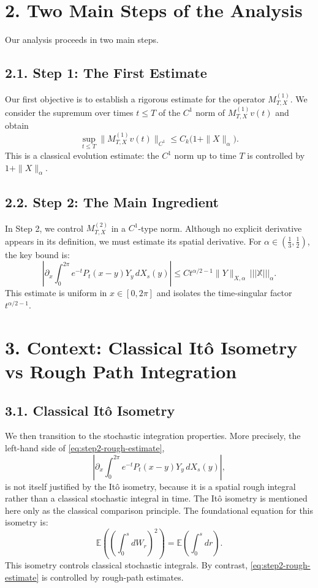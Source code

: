 \documentclass[11pt]{article}
\theoremstyle{definition}
\theoremstyle{remark}
\begin{document}
\section*{2. Two Main Steps of the Analysis}
Our analysis proceeds in two main steps.

\subsection*{2.1. Step 1: The First Estimate}
Our first objective is to establish a rigorous estimate for the operator $M_{T,X}^{(1)}$. We consider the supremum over times $t\leq T$ of the $C^1$ norm of $M_{T,X}^{(1)}v(t)$ and obtain
\[
\sup_{t\le T}\|M_{T,X}^{(1)}v(t)\|_{C^1}\le C_k\bigl(1+\|X\|_\alpha\bigr).
\]
This is a classical evolution estimate: the $C^1$ norm up to time $T$ is controlled by $1+\|X\|_\alpha$.

\subsection*{2.2. Step 2: The Main Ingredient}
In Step 2, we control $M_{T,X}^{(2)}$ in a $C^1$-type norm. Although no explicit derivative appears in its definition, we must estimate its spatial derivative. For $\alpha\in(\frac13,\frac12)$, the key bound is:
\begin{equation}\label{eq:step2-rough-estimate}
\left|\partial_x\int_0^{2\pi} e^{-t}P_t(x-y)Y_y\,dX_s(y)\right|
\le C t^{\alpha/2-1} \|Y\|_{X,\alpha}\, |||\mathbb X|||_{\alpha}.
\end{equation}
This estimate is uniform in $x\in[0,2\pi]$ and isolates the time-singular factor $t^{\alpha/2-1}$.

\section*{3. Context: Classical It\^o Isometry vs Rough Path Integration}
\subsection*{3.1. Classical It\^o Isometry}
We then transition to the stochastic integration properties. More precisely, the left-hand side of \eqref{eq:step2-rough-estimate},
\[
\left|\partial_x\int_0^{2\pi} e^{-t}P_t(x-y)Y_y\,dX_s(y)\right|,
\]
is not itself justified by the It\^o isometry, because it is a spatial rough integral rather than a classical stochastic integral in time. The It\^o isometry is mentioned here only as the classical comparison principle. The foundational equation for this isometry is:
\[
\mathbb E\!\left(\left(\int_0^s dW_r\right)^2\right)=\mathbb E\!\left(\int_0^s dr\right).
\]
This isometry controls classical stochastic integrals. By contrast, \eqref{eq:step2-rough-estimate} is controlled by rough-path estimates.
\end{document}
